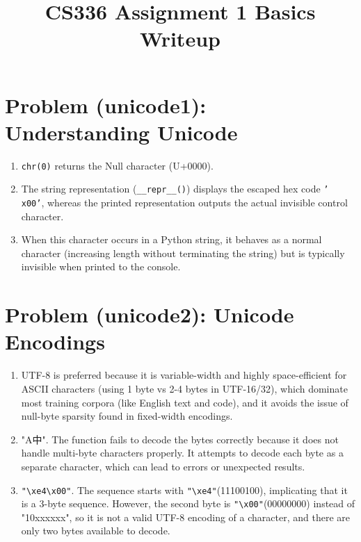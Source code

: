 \documentclass{article}
\title{CS336 Assignment 1 Basics Writeup}
\author{}
\date{}
\begin{document}
\maketitle

\section*{Problem (unicode1): Understanding Unicode}

\begin{enumerate}
    \item[(a)] \texttt{chr(0)} returns the Null character (U+0000).
    \item[(b)] The string representation (\texttt{\_\_repr\_\_()}) displays the escaped hex code \texttt{'\\x00'}, whereas the printed representation outputs the actual invisible control character.
    \item[(c)] When this character occurs in a Python string, it behaves as a normal character (increasing length without terminating the string) but is typically invisible when printed to the console.
\end{enumerate}

\section*{Problem (unicode2): Unicode Encodings}

\begin{enumerate}
    \item[(a)] UTF-8 is preferred because it is variable-width and highly space-efficient for ASCII characters (using 1 byte vs 2-4 bytes in UTF-16/32), which dominate most training corpora (like English text and code), and it avoids the issue of null-byte sparsity found in fixed-width encodings.
    \item[(b)] "A中". The function fails to decode the bytes correctly because it does not handle multi-byte characters properly. It attempts to decode each byte as a separate character, which can lead to errors or unexpected results.
    \item[(c)] \texttt{"\textbackslash xe4\textbackslash x00"}. The sequence starts with \texttt{"\textbackslash xe4"}(11100100), implicating that it is a 3-byte sequence. However, the second byte is \texttt{"\textbackslash x00"}(00000000) instead of "10xxxxxx", so it is not a valid UTF-8 encoding of a character, and there are only two bytes available to decode.
\end{enumerate}
\end{document}
